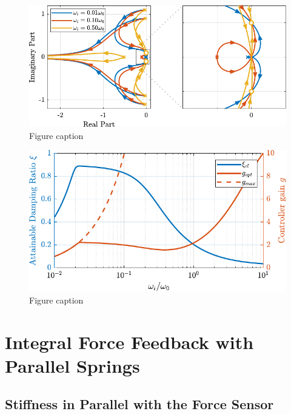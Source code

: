 \documentclass{ISMA_USD2020}
\begin{document}
\begin{figure}[htbp]
\centering
\includegraphics[scale=1]{figs/root_locus_wi_modified_iff.pdf}
\caption{\label{fig:root_locus_wi_modified_iff}Figure caption}
\end{figure}

\begin{figure}[htbp]
\centering
\includegraphics[scale=1]{figs/mod_iff_damping_wi.pdf}
\caption{\label{fig:mod_iff_damping_wi}Figure caption}
\end{figure}

\section{Integral Force Feedback with Parallel Springs}
\label{sec:org03c54a4}
\subsection{Stiffness in Parallel with the Force Sensor}
\label{sec:orgc2d9221}
\end{document}
